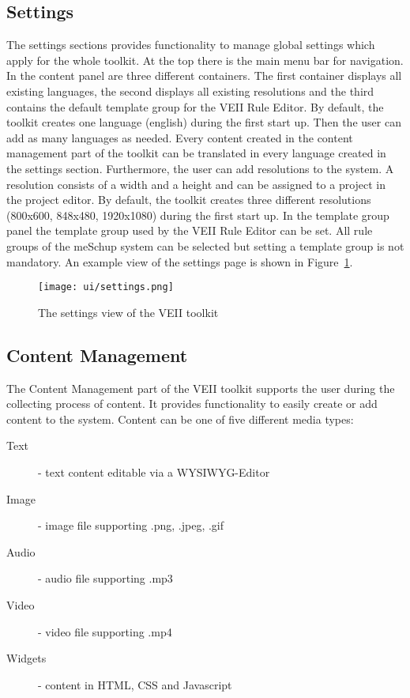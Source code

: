 \subsection{Settings}
The settings sections provides functionality to manage global settings which apply for the whole toolkit. At the top there is the main menu bar for navigation. In the content panel are three different containers. The first container displays all existing languages, the second displays all existing resolutions and the third contains the default template group for the VEII Rule Editor. By default, the toolkit creates one language (english) during the first start up. Then the user can add as many languages as needed. Every content created in the content management part of the toolkit can be translated in every language created in the settings section. Furthermore, the user can add resolutions to the system. A resolution consists of a width and a height and can be assigned to a project in the project editor. By default, the toolkit creates three different resolutions (800x600, 848x480, 1920x1080) during the first start up. In the template group panel the template group used by the VEII Rule Editor can be set. All rule groups of the meSchup system can be selected but setting a template group is not mandatory. An example view of the settings page is shown in Figure~\ref{fig:settings}.

\begin{figure}
  \begin{center}
    \texttt{[image: ui/settings.png]}
    \caption{The settings view of the VEII toolkit}
    \label{fig:settings}
  \end{center}
\end{figure}

\subsection{Content Management}
The Content Management part of the VEII toolkit supports the user during the collecting process of content. It provides functionality to easily create or add content to the system. Content can be one of five different media types:

\begin{description}
\item [Text] - text content editable via a WYSIWYG-Editor
\item [Image] - image file supporting .png, .jpeg, .gif
\item [Audio] - audio file supporting .mp3
\item [Video] - video file supporting .mp4
\item [Widgets] - content in HTML, CSS and Javascript
\end{description}


